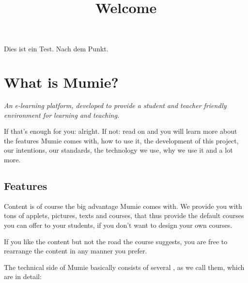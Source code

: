 \documentclass{webpage}
\begin{document}
Dies ist ein Test. Nach dem Punkt.

\title{Welcome}

\section{What is Mumie?}
\emph{ An e-learning platform, developed to provide a student and teacher friendly environment for 
learning and teaching.}

If that's enough for you: alright. If not: read on and you will learn more
about the features Mumie comes with, how to use it, the development of this project, 
our intentions, our standards, the technology we use, why we use it and a lot more.

\subsection{Features}
Content is of course the big advantage Mumie comes with. We provide you with tons of
applets, pictures, texts and  courses, that thus provide the default courses
you can offer to your students, if you don't want to design your own courses.

If you like the content but not the road the course suggests, you are free to rearrange the
content in any manner you prefer.

The technical side of Mumie basically consists of several , as we call them, which
are in detail:
\end{document}
